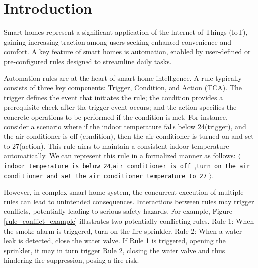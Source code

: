 \section{Introduction}

Smart homes represent a significant application of the Internet of Things (IoT), gaining increasing traction among users seeking enhanced convenience and comfort. A key feature of smart homes is automation, enabled by user-defined or pre-configured rules designed to streamline daily tasks.

Automation rules are at the heart of smart home intelligence. A rule typically consists of three key components: Trigger, Condition, and Action (TCA). The trigger defines the event that initiates the rule; the condition provides a prerequisite check after the trigger event occurs; and the action specifies the concrete operations to be performed if the condition is met. For instance, consider a scenario where if the indoor temperature falls below 24\celsius (trigger), and the air conditioner is off (condition), then the air conditioner is turned on and set to 27\celsius (action). This rule aims to maintain a consistent indoor temperature automatically. We can represent this rule in a formalized manner as follows: $\langle$ \texttt{indoor temperature is below 24\celsius },\texttt{air conditioner is off },\texttt{turn on the air conditioner and set the air conditioner temperature to 27\celsius } $\rangle$.

However, in complex smart home system, the concurrent execution of multiple rules can lead to unintended consequences. Interactions between rules may trigger conflicts, potentially leading to serious safety hazards. For example, Figure \ref{rule_conflict_example} illustrates two potentially conflicting rules. Rule 1: When the smoke alarm is triggered, turn on the fire sprinkler. Rule 2: When a water leak is detected, close the water valve. If Rule 1 is triggered, opening the sprinkler, it may in turn trigger Rule 2, closing the water valve and thus hindering fire suppression, posing a fire risk.

